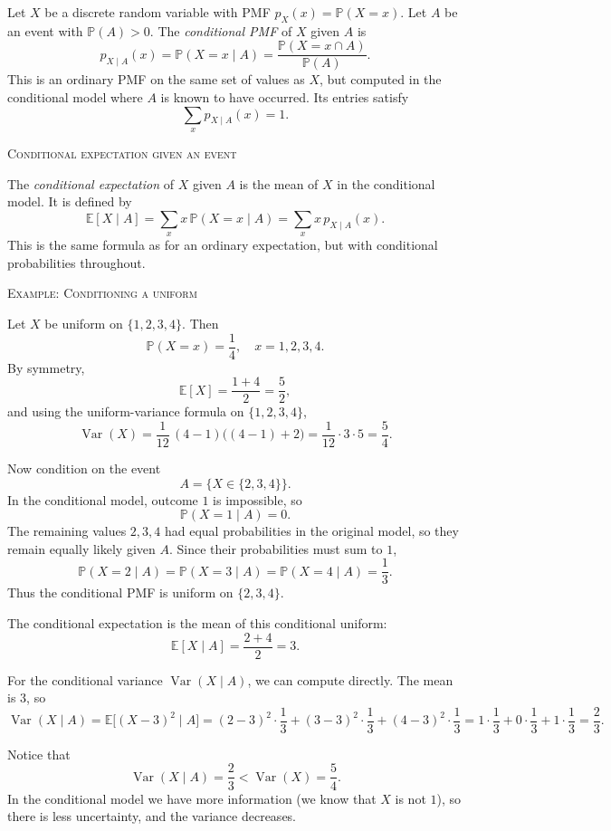 Let \(X\) be a discrete random variable with PMF \(p_X(x) = \mathbb{P}(X = x)\).  
Let \(A\) be an event with \(\mathbb{P}(A) > 0\).  
The \textit{conditional PMF} of \(X\) given \(A\) is
\[
p_{X\mid A}(x) = \mathbb{P}(X = x \mid A)
= \frac{\mathbb{P}(X = x \cap A)}{\mathbb{P}(A)}.
\]
This is an ordinary PMF on the same set of values as \(X\), but computed in the conditional model where \(A\) is known to have occurred.  
Its entries satisfy
\[
\sum_{x} p_{X\mid A}(x) = 1.
\]

\bigskip\textsc{Conditional expectation given an event}

The \textit{conditional expectation} of \(X\) given \(A\) is the mean of \(X\) in the conditional model.  
It is defined by
\[
\mathbb{E}[X \mid A] = \sum_{x} x\,\mathbb{P}(X = x \mid A)
= \sum_{x} x\,p_{X\mid A}(x).
\]
This is the same formula as for an ordinary expectation, but with conditional probabilities throughout.

\bigskip\textsc{Example: Conditioning a uniform}

Let \(X\) be uniform on \(\{1,2,3,4\}\).  
Then
\[
\mathbb{P}(X=x) = \frac{1}{4}, \quad x=1,2,3,4.
\]
By symmetry,
\[
\mathbb{E}[X] = \frac{1+4}{2} = \frac{5}{2},
\]
and using the uniform-variance formula on \(\{1,2,3,4\}\),
\[
\operatorname{Var}(X) = \frac{1}{12}\,(4-1)\bigl((4-1)+2\bigr)
= \frac{1}{12} \cdot 3 \cdot 5 = \frac{5}{4}.
\]

Now condition on the event
\[
A = \{X \in \{2,3,4\}\}.
\]
In the conditional model, outcome \(1\) is impossible, so
\[
\mathbb{P}(X=1 \mid A) = 0.
\]
The remaining values \(2,3,4\) had equal probabilities in the original model, so they remain equally likely given \(A\).  
Since their probabilities must sum to \(1\),
\[
\mathbb{P}(X=2 \mid A)
= \mathbb{P}(X=3 \mid A)
= \mathbb{P}(X=4 \mid A)
= \frac{1}{3}.
\]
Thus the conditional PMF is uniform on \(\{2,3,4\}\).

The conditional expectation is the mean of this conditional uniform:
\[
\mathbb{E}[X \mid A] = \frac{2+4}{2} = 3.
\]

For the conditional variance \(\operatorname{Var}(X \mid A)\), we can compute directly.  
The mean is \(3\), so
\[
\operatorname{Var}(X \mid A)
= \mathbb{E}\bigl[(X-3)^2 \mid A\bigr]
= (2-3)^2 \cdot \frac{1}{3}
  + (3-3)^2 \cdot \frac{1}{3}
  + (4-3)^2 \cdot \frac{1}{3}
= 1 \cdot \frac{1}{3} + 0 \cdot \frac{1}{3} + 1 \cdot \frac{1}{3}
= \frac{2}{3}.
\]

Notice that
\[
\operatorname{Var}(X \mid A) = \frac{2}{3} < \operatorname{Var}(X) = \frac{5}{4}.
\]
In the conditional model we have more information (we know that \(X\) is not \(1\)), so there is less uncertainty, and the variance decreases.



